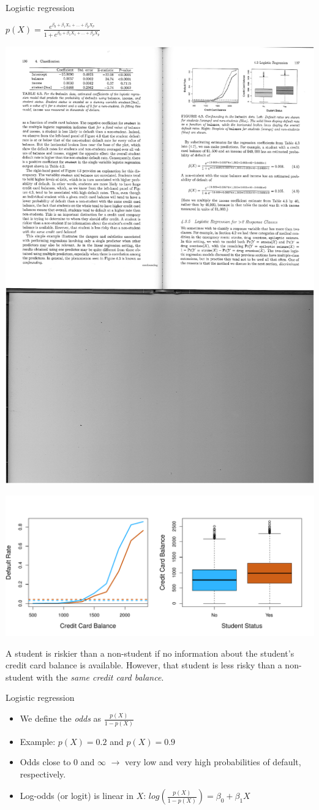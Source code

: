 \documentclass[14pt]{beamer}
\begin{document}
\begin{frame}{Logistic regression}

\centerline{$p(X) = \frac{e^{\beta_0 + \beta_1 X_1 + \dots + \beta_p X_p}}{1 + e^{\beta_0 + \beta_1 X_1 + \dots + \beta_p X_p  }} $}

\centerline{\includegraphics[width=.7\textwidth]{Table3}}
\vspace{-.5cm}
\centerline{\includegraphics[width=.7\textwidth]{4-3}}

{\small A student is riskier than a non-student if no information about the student's credit card balance is available. However, that student is less risky than a non-student with the \emph{same credit card balance}.}

\end{frame}

\begin{frame}{Logistic regression}\large

\begin{itemize}
\item We define the \emph{odds} as $\frac{p(X)}{1 - p(X)}$ 
\item Example: $p(X) = 0.2$ and $p(X) = 0.9$
\item Odds close to $0$ and $\infty$ $\rightarrow$ very low and very high probabilities of default, respectively.
\item Log-odds (or logit) is linear in $X$: $log(\frac{p(X)}{1 - p(X)}) = \beta_0 + \beta_1 X$
\end{itemize}

\end{frame}
\end{document}
